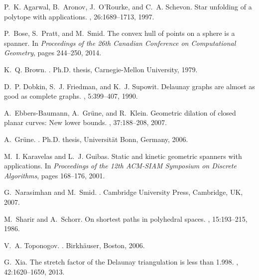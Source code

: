 \documentclass[12pt]{article}
\begin{document}
\begin{thebibliography}{10}

P.~K. Agarwal, B.~Aronov, J.~O'Rourke, and C.~A. Schevon.
\newblock Star unfolding of a polytope with applications.
, 26:1689--1713, 1997.

P.~Bose, S.~Pratt, and M.~Smid.
\newblock The convex hull of points on a sphere is a spanner.
\newblock In {\em Proceedings of the 26th Canadian Conference on Computational
  Geometry}, pages 244--250, 2014.

K.~Q. Brown.
.
\newblock Ph.{D}. thesis, Carnegie-Mellon University, 1979.

D.~P. Dobkin, S.~J. Friedman, and K.~J. Supowit.
\newblock Delaunay graphs are almost as good as complete graphs.
, 5:399--407, 1990.

A.~Ebbers-Baumann, A.~Gr{\"u}ne, and R.~Klein.
\newblock Geometric dilation of closed planar curves: {New} lower bounds.
, 37:188--208,
  2007.

A.~Gr{\"u}ne.
.
\newblock Ph.{D}. thesis, Universit{\"a}t Bonn, Germany, 2006.

M.~I. Karavelas and L.~J. Guibas.
\newblock Static and kinetic geometric spanners with applications.
\newblock In {\em Proceedings of the 12th ACM-SIAM Symposium on Discrete
  Algorithms}, pages 168--176, 2001.

G.~Narasimhan and M.~Smid.
.
\newblock Cambridge University Press, Cambridge, UK, 2007.

M.~Sharir and A.~Schorr.
\newblock On shortest paths in polyhedral spaces.
, 15:193--215, 1986.

V.~A. Toponogov.
.
\newblock Birkh{\"a}user, Boston, 2006.

G.~Xia.
\newblock The stretch factor of the {Delaunay} triangulation is less than
  1.998.
, 42:1620--1659, 2013.

\end{thebibliography}
\end{document}
